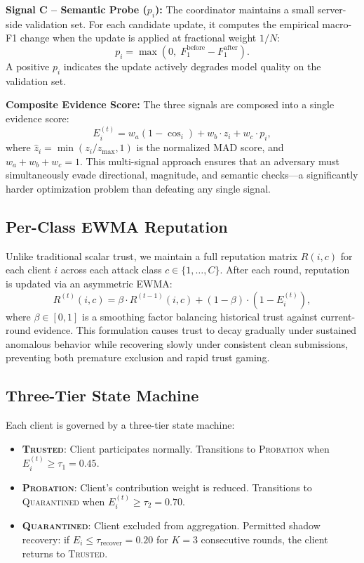 \documentclass[conference]{IEEEtran}
\begin{document}
\textbf{Signal C -- Semantic Probe ($p_i$):}
The coordinator maintains a small server-side validation set. For each candidate update, it computes the empirical macro-F1 change when the update is applied at fractional weight $1/N$:
\begin{equation}
p_i = \max(0, \; F_1^{\text{before}} - F_1^{\text{after}}).
\label{eq:probe}
\end{equation}
A positive $p_i$ indicates the update actively degrades model quality on the validation set.

\textbf{Composite Evidence Score:}
The three signals are composed into a single evidence score:
\begin{equation}
E_i^{(t)} = w_a(1 - \cos_i) + w_b \cdot \hat{z}_i + w_c \cdot p_i,
\label{eq:evidence}
\end{equation}
where $\hat{z}_i = \min(z_i / z_{\max}, 1)$ is the normalized MAD score, and $w_a + w_b + w_c = 1$. This multi-signal approach ensures that an adversary must simultaneously evade directional, magnitude, and semantic checks---a significantly harder optimization problem than defeating any single signal.

\subsection{Per-Class EWMA Reputation}
Unlike traditional scalar trust, we maintain a full reputation matrix $R(i, c)$ for each client $i$ across each attack class $c \in \{1, \ldots, C\}$. After each round, reputation is updated via an asymmetric EWMA:
\begin{equation}
R^{(t)}(i, c) = \beta \cdot R^{(t-1)}(i, c) + (1 - \beta) \cdot (1 - E_i^{(t)}),
\label{eq:reputation}
\end{equation}
where $\beta \in [0, 1]$ is a smoothing factor balancing historical trust against current-round evidence. This formulation causes trust to decay gradually under sustained anomalous behavior while recovering slowly under consistent clean submissions, preventing both premature exclusion and rapid trust gaming.

\subsection{Three-Tier State Machine}
Each client is governed by a three-tier state machine:
\begin{itemize}
    \item \textbf{\textsc{Trusted}}: Client participates normally. Transitions to \textsc{Probation} when $E_i^{(t)} \ge \tau_1 = 0.45$.
    \item \textbf{\textsc{Probation}}: Client's contribution weight is reduced. Transitions to \textsc{Quarantined} when $E_i^{(t)} \ge \tau_2 = 0.70$.
    \item \textbf{\textsc{Quarantined}}: Client excluded from aggregation. Permitted shadow recovery: if $E_i \le \tau_{\text{recover}} = 0.20$ for $K = 3$ consecutive rounds, the client returns to \textsc{Trusted}.
\end{itemize}
\end{document}
